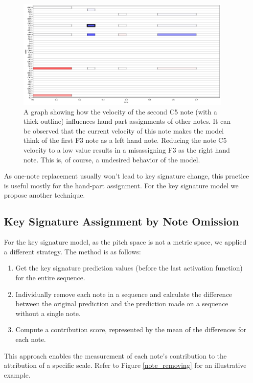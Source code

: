 \begin{figure}[!ht]
\centering
\includegraphics[width=0.95\textwidth]{images/lime_hand_part.png}
\caption[A graph showing how the velocity of a note influences hand part assignments of other notes]{A graph showing how the velocity of the second C5 note (with a thick outline) influences hand part assignments of other notes. It can be observed that the current velocity of this note makes the model think of the first F3 note as a left hand note. Reducing the note C5 velocity to a low value results in a misassigning F3 as the right hand note. This is, of course, a undesired behavior of the model.}
\label{hand_part_misalignment}\end{figure}

As one-note replacement usually won't lead to key signature change, this practice is useful mostly for the hand-part assignment. For the key signature model we propose another technique.

\subsection{Key Signature Assignment by Note Omission}

For the key signature model, as the pitch space is not a metric space, we applied a different strategy. The method is as follows: \begin{enumerate}
	\item Get the key signature prediction values (before the last activation function) for the entire sequence.
	\item Individually remove each note in a sequence and calculate the difference between the original prediction and the prediction made on a sequence without a single note.
	\item Compute a contribution score, represented by the mean of the differences for each note.
	\end{enumerate} This approach enables the measurement of each note's contribution to the attribution of a specific scale. Refer to Figure \ref{note_removing} for an illustrative example.
	
